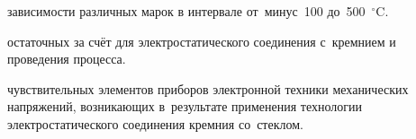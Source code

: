 \item \label{defposition_one} зависимости 
различных марок  в интервале от~минус~100
до~500~${}^\circ$C.
\item \label{defposition_two}
остаточных  за счёт  для
электростатического соединения с~кремнием и~ проведения
процесса.
\item \label{defposition_three} чувствительных элементов приборов электронной техники
 механических напряжений,
возникающих в~результате применения технологии электростатического
соединения кремния со~стеклом.
